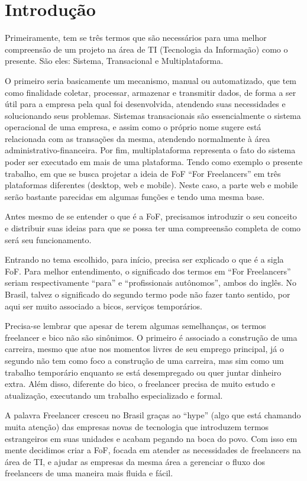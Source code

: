 \section{Introdução}
\vspace*{1cm}
Primeiramente, tem se três termos que são necessários para uma melhor compreensão de um projeto na área de TI (Tecnologia da Informação) como o presente. São eles: Sistema, Transacional e Multiplataforma.\par
O primeiro seria basicamente um mecanismo, manual ou automatizado, que tem como finalidade coletar, processar, armazenar e transmitir dados, de forma a ser útil para a empresa pela qual foi desenvolvida, atendendo suas necessidades e solucionando seus problemas. Sistemas transacionais são essencialmente o sistema operacional de uma empresa, e assim como o próprio nome sugere está relacionada com as transações da mesma, atendendo normalmente à área administrativo-financeira. Por fim, multiplataforma representa o fato do sistema poder ser executado em mais de uma plataforma. Tendo como exemplo o presente trabalho, em que se busca projetar a ideia de FoF “For Freelancers” em três plataformas diferentes (desktop, web e mobile). Neste caso, a parte web e mobile serão bastante parecidas em algumas funções e tendo uma mesma base.\par
Antes mesmo de se entender o que é a FoF, precisamos introduzir o seu conceito e distribuir suas ideias para que se possa ter uma compreensão completa de como será seu funcionamento. \par
Entrando no tema escolhido, para início, precisa ser explicado o que é a sigla FoF. Para melhor entendimento, o significado dos termos em “For Freelancers” seriam respectivamente “para” e “profissionais autônomos”, ambos do inglês. No Brasil, talvez o significado do segundo termo pode não fazer tanto sentido, por aqui ser muito associado a bicos, serviços temporários. \par
Precisa-se lembrar que apesar de terem algumas semelhanças, os termos freelancer e bico não são sinônimos. O primeiro é associado a construção de uma carreira, mesmo que atue nos momentos livres de seu emprego principal, já o segundo não tem como foco a construção de uma carreira, mas sim como um trabalho temporário enquanto se está desempregado ou quer juntar dinheiro extra. Além disso, diferente do bico, o freelancer precisa de muito estudo e atualização, executando um trabalho especializado e formal.\par
A palavra Freelancer cresceu no Brasil graças ao “hype” (algo que está chamando muita atenção) das empresas novas de tecnologia que introduzem termos estrangeiros em suas unidades e acabam pegando na boca do povo. Com isso em mente decidimos criar a FoF, focada em atender as necessidades de freelancers na área de TI, e ajudar as empresas da mesma área a gerenciar o fluxo dos freelancers de uma maneira mais fluida e fácil.
